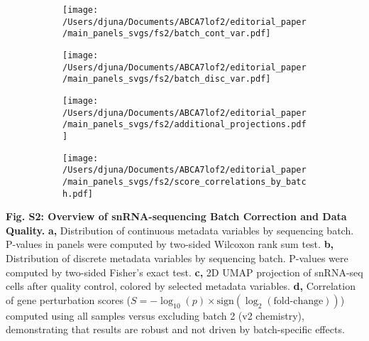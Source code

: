\documentclass[12pt]{article}
\begin{document}
\begin{figure}[H]
    \begin{subfigure}[t]{\textwidth}
        \caption{}
        \texttt{[image: /Users/djuna/Documents/ABCA7lof2/editorial\_paper/main\_panels\_svgs/fs2/batch\_cont\_var.pdf]}        
    \end{subfigure}
    \begin{subfigure}[t]{\textwidth}
        \caption{}
        \texttt{[image: /Users/djuna/Documents/ABCA7lof2/editorial\_paper/main\_panels\_svgs/fs2/batch\_disc\_var.pdf]}        
    \end{subfigure}  
    \begin{subfigure}[t]{\textwidth}
        \caption{}
        \texttt{[image: /Users/djuna/Documents/ABCA7lof2/editorial\_paper/main\_panels\_svgs/fs2/additional\_projections.pdf]}        
    \end{subfigure}   
    \begin{subfigure}[t]{\textwidth}
        \caption{}
        \texttt{[image: /Users/djuna/Documents/ABCA7lof2/editorial\_paper/main\_panels\_svgs/fs2/score\_correlations\_by\_batch.pdf]}        
    \end{subfigure}   
\end{figure}
\textbf{Fig. S2: Overview of snRNA-sequencing Batch Correction and Data Quality.}
\textbf{a,} Distribution of continuous metadata variables by sequencing batch. P-values in panels were computed by two-sided Wilcoxon rank sum test.
\textbf{b,} Distribution of discrete metadata variables by sequencing batch. P-values were computed by two-sided Fisher's exact test.
\textbf{c,} 2D UMAP projection of snRNA-seq cells after quality control, colored by selected metadata variables.
\textbf{d,} Correlation of gene perturbation scores ($S = -\log_{10}(p)\times\text{sign}(\log_2(\text{fold-change}))$) computed using all samples versus excluding batch 2 (v2 chemistry), demonstrating that results are robust and not driven by batch-specific effects.
\end{document}
